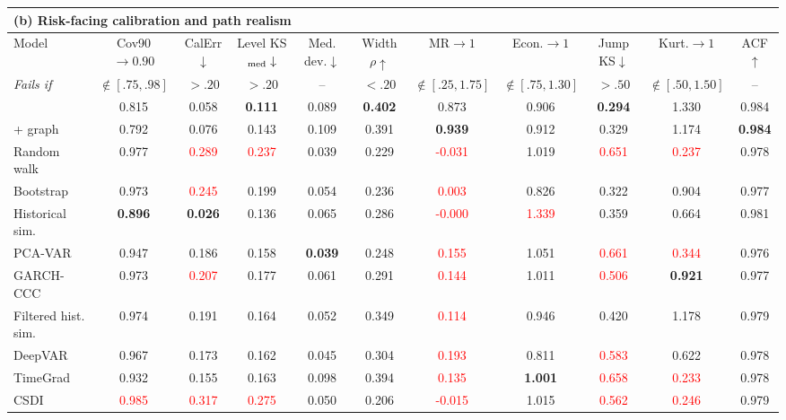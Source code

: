 \begin{table}[t]
\medskip

\begin{tabular*}{\textwidth}{@{\extracolsep{\fill}}lcccccccccc@{}}
\toprule
\multicolumn{11}{l}{\textbf{(b) Risk-facing calibration and path realism}} \\
\midrule
Model & Cov90$\to0.90$ & CalErr$\downarrow$ & Level KS$_{\rm med}\downarrow$ & Med. dev.$\downarrow$ & Width $\rho\uparrow$ & MR$\to1$ & Econ.$\to1$ & Jump KS$\downarrow$ & Kurt.$\to1$ & ACF$\uparrow$ \\
\textit{Fails if} & $\notin[.75,.98]$ & $>.20$ & $>.20$ & -- & $<.20$ & $\notin[.25,1.75]$ & $\notin[.75,1.30]$ & $>.50$ & $\notin[.50,1.50]$ & -- \\
\midrule
\scenarioflow{} & 0.815 & 0.058 & \textbf{0.111} & 0.089 & \textbf{0.402} & 0.873 & 0.906 & \textbf{0.294} & 1.330 & 0.984 \\
\scenarioflow{} + graph & 0.792 & 0.076 & 0.143 & 0.109 & 0.391 & \textbf{0.939} & 0.912 & 0.329 & 1.174 & \textbf{0.984} \\
Random walk & 0.977 & \textcolor{red}{0.289} & \textcolor{red}{0.237} & 0.039 & 0.229 & \textcolor{red}{-0.031} & 1.019 & \textcolor{red}{0.651} & \textcolor{red}{0.237} & 0.978 \\
Bootstrap & 0.973 & \textcolor{red}{0.245} & 0.199 & 0.054 & 0.236 & \textcolor{red}{0.003} & 0.826 & 0.322 & 0.904 & 0.977 \\
Historical sim. & \textbf{0.896} & \textbf{0.026} & 0.136 & 0.065 & 0.286 & \textcolor{red}{-0.000} & \textcolor{red}{1.339} & 0.359 & 0.664 & 0.981 \\
PCA-VAR & 0.947 & 0.186 & 0.158 & \textbf{0.039} & 0.248 & \textcolor{red}{0.155} & 1.051 & \textcolor{red}{0.661} & \textcolor{red}{0.344} & 0.976 \\
GARCH-CCC & 0.973 & \textcolor{red}{0.207} & 0.177 & 0.061 & 0.291 & \textcolor{red}{0.144} & 1.011 & \textcolor{red}{0.506} & \textbf{0.921} & 0.977 \\
Filtered hist. sim. & 0.974 & 0.191 & 0.164 & 0.052 & 0.349 & \textcolor{red}{0.114} & 0.946 & 0.420 & 1.178 & 0.979 \\
DeepVAR & 0.967 & 0.173 & 0.162 & 0.045 & 0.304 & \textcolor{red}{0.193} & 0.811 & \textcolor{red}{0.583} & 0.622 & 0.978 \\
TimeGrad & 0.932 & 0.155 & 0.163 & 0.098 & 0.394 & \textcolor{red}{0.135} & \textbf{1.001} & \textcolor{red}{0.658} & \textcolor{red}{0.233} & 0.978 \\
CSDI & \textcolor{red}{0.985} & \textcolor{red}{0.317} & \textcolor{red}{0.275} & 0.050 & 0.206 & \textcolor{red}{-0.015} & 1.015 & \textcolor{red}{0.562} & \textcolor{red}{0.246} & 0.979 \\
\bottomrule
\end{tabular*}
\end{table}
